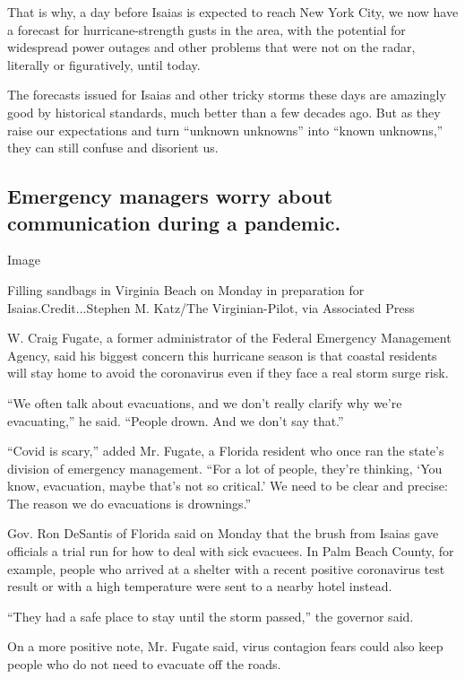 That is why, a day before Isaias is expected to reach New York City, we
now have a forecast for hurricane-strength gusts in the area, with the
potential for widespread power outages and other problems that were not
on the radar, literally or figuratively, until today.

The forecasts issued for Isaias and other tricky storms these days are
amazingly good by historical standards, much better than a few decades
ago. But as they raise our expectations and turn ``unknown unknowns''
into ``known unknowns,'' they can still confuse and disorient us.

\hypertarget{emergency-managers-worry-about-communication-during-a-pandemic}{%
\subsection{Emergency managers worry about communication during a
pandemic.}\label{emergency-managers-worry-about-communication-during-a-pandemic}}

Image

Filling sandbags in Virginia Beach on Monday in preparation for
Isaias.Credit...Stephen M. Katz/The Virginian-Pilot, via Associated
Press

W. Craig Fugate, a former administrator of the Federal Emergency
Management Agency, said his biggest concern this hurricane season is
that coastal residents will stay home to avoid the coronavirus even if
they face a real storm surge risk.

``We often talk about evacuations, and we don't really clarify why we're
evacuating,'' he said. ``People drown. And we don't say that.''

``Covid is scary,'' added Mr. Fugate, a Florida resident who once ran
the state's division of emergency management. ``For a lot of people,
they're thinking, `You know, evacuation, maybe that's not so critical.'
We need to be clear and precise: The reason we do evacuations is
drownings.''

Gov. Ron DeSantis of Florida said on Monday that the brush from Isaias
gave officials a trial run for how to deal with sick evacuees. In Palm
Beach County, for example, people who arrived at a shelter with a recent
positive coronavirus test result or with a high temperature were sent to
a nearby hotel instead.

``They had a safe place to stay until the storm passed,'' the governor
said.

On a more positive note, Mr. Fugate said, virus contagion fears could
also keep people who do not need to evacuate off the roads.

